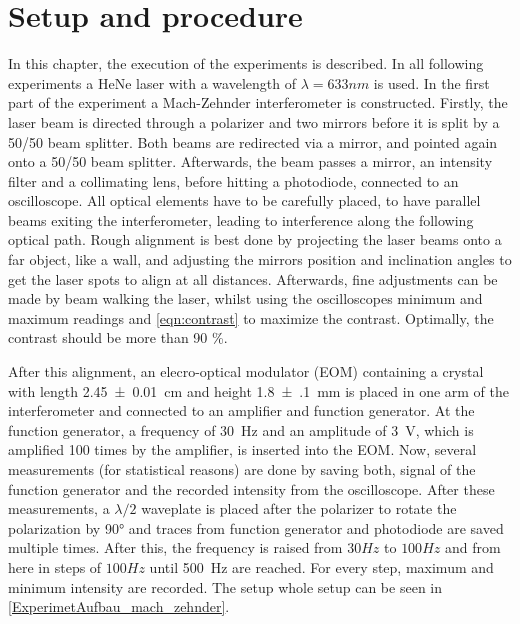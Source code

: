\section{Setup and procedure}
In this chapter, the execution of the experiments is described. In all following experiments a HeNe laser with a wavelength of $\lambda = 633 \unit{nm}$ is used. In the first part of the experiment a Mach-Zehnder interferometer is constructed. 
Firstly, the laser beam is directed through a polarizer and two mirrors before it is split by a 50/50 beam splitter. Both beams are redirected via a mirror, and pointed again onto a 50/50 beam splitter. Afterwards, the beam passes a mirror, an intensity filter and a collimating lens, before hitting a photodiode, connected to an oscilloscope. All optical elements have to be carefully placed, to have parallel beams exiting the interferometer, leading to interference along the following optical path. Rough alignment is best done by projecting the laser beams onto a far object, like a wall, and adjusting the mirrors position and inclination angles to get the laser spots to align at all distances. Afterwards, fine adjustments can be made by beam walking the laser, whilst using the oscilloscopes minimum and maximum readings and \autoref{eqn:contrast} to maximize the contrast. Optimally, the contrast should be more than 90 \%. 

After this alignment, an elecro-optical modulator (EOM) containing a  crystal with length \SI{2.45(1)}{cm} and height \SI{1.8(1)}{mm} is placed in one arm of the interferometer and connected to an amplifier and function generator. At the function generator, a frequency of \SI{30}{Hz} and an amplitude of \SI{3}{V}, which is amplified 100 times by the amplifier, is inserted into the EOM. Now, several measurements (for statistical reasons) are done by saving both, signal of the function generator and the recorded intensity from the oscilloscope. After these measurements, a $\lambda/2$ waveplate is placed after the polarizer to rotate the polarization by \ang{90} and traces from function generator and photodiode are saved multiple times. After this, the frequency is raised from $30 \unit{Hz}$ to $100 \unit{Hz}$ and from here in steps of $100 \unit{Hz}$ until \SI{500}{Hz} are reached. For every step, maximum and minimum intensity are recorded. The setup whole setup can be seen in \autoref{ExperimetAufbau_mach_zehnder}. 

